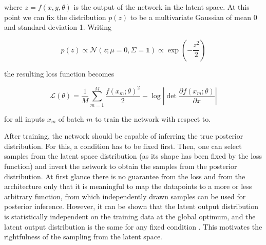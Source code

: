 where $z = f(x, y, \theta)$ is the output of the network in the latent space. At this point we can fix the distribution $p(z)$ to be a multivariate Gaussian of mean 0 and standard deviation 1. Writing

\begin{equation*}
	p(z) \propto \mathcal{N}(z; \mu = 0, \Sigma=\mathbb{1}) \propto \exp\left(-\frac{z^2}{2}\right)
\end{equation*}

the resulting loss function becomes

\begin{equation*}
	\mathcal{L}(\theta) = \frac{1}{M} \sum_{m=1}^{M} \frac{f(x_m; \theta)^2}{2} - \log\left|\det\frac{\partial f(x_m; \theta)}{\partial x}\right|
\end{equation*}

for all inputs $x_m$ of batch $m$ to train the network with respect to.

After training, the network should be capable of inferring the true posterior distribution. For this, a condition has to be fixed first. Then, one can select samples from the latent space distribution (as its shape has been fixed by the loss function) and invert the network to obtain the samples from the posterior distribution.
At first glance there is no guarantee from the loss and from the architecture only that it is meaningful to map the datapoints to a more or less arbitrary function, from which independently drawn samples can be used for posterior inference. However, it can be shown that the latent output distribution is statistically independent on the training data at the global optimum, and the latent output distribution is the same for any fixed condition \cite{BayesFlow}. This motivates the rightfulness of the sampling from the latent space.

